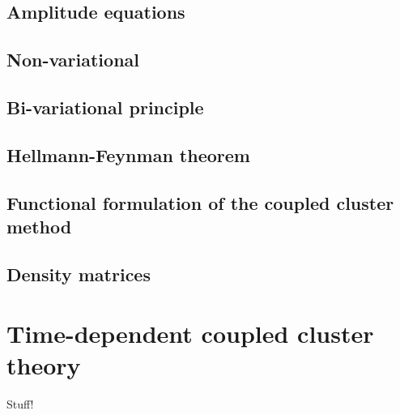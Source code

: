         \subsection{Amplitude equations}
        \subsection{Non-variational}
        \subsection{Bi-variational principle}
        \subsection{Hellmann-Feynman theorem}
        \subsection{Functional formulation of the coupled cluster method}
        \subsection{Density matrices}

    \section{Time-dependent coupled cluster theory}
        Stuff!

